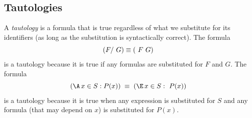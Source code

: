 \documentclass[fleqn,leqno]{article}
\begin{document}
\subsection*{Tautologies}

A 
\emph{tautology} is a formula that is true regardless of what we
substitute for its identifiers (as long as the substitution is
syntactically correct).  The formula
 \[ ~(F /\ G) \equiv (~F \/ ~G) \]
is a tautology because it is true if any formulas 
are substituted for $F$ and $G$.  The formula
 \[ ~ (\A\,x \in S : P(x)) \;\equiv\; (\E\, x \in S : ~P(x))
 \]
is a tautology because it is true when any expression is substituted
for $S$ and any formula (that may depend on $x$) is substituted for
$P(x)$.
\end{document}
